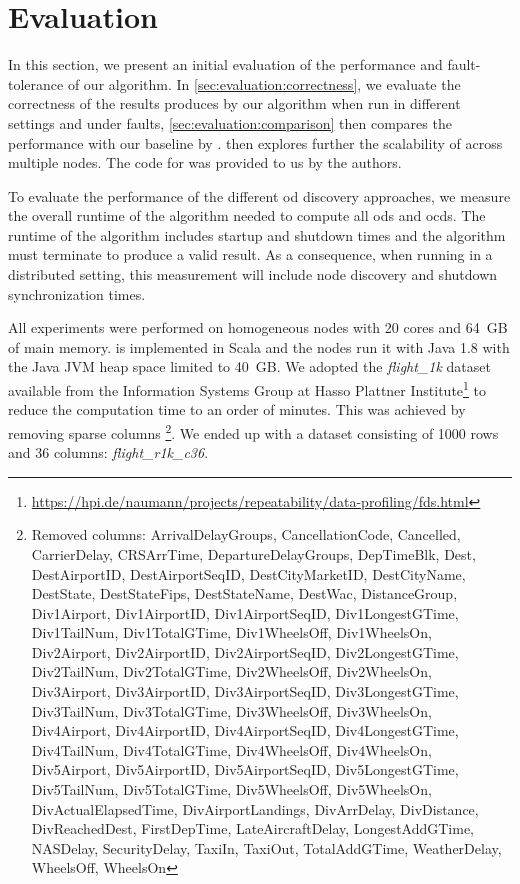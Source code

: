 
\section{Evaluation}\label{sec:evaluation}

  In this section, we present an initial evaluation of the performance and fault-tolerance of our algorithm.
  In \cref{sec:evaluation:correctness}, we evaluate the correctness of the results produces by our algorithm when run in different settings and under faults, \cref{sec:evaluation:comparison} then compares the performance with our baseline \ocddiscover{} by \citeauthor{consonni}.
   then explores further the scalability of \dodo{} across multiple nodes.
  The code for \ocddiscover{} was provided to us by the authors.

  To evaluate the performance of the different \gls{od} discovery approaches, we measure the overall runtime of the algorithm needed to compute all \glspl{od} and \glspl{ocd}.
  The runtime of the algorithm includes startup and shutdown times and the algorithm must terminate to produce a valid result.
  As a consequence, when running \dodo{} in a distributed setting, this measurement will include node discovery and shutdown synchronization times.

  All experiments were performed on homogeneous nodes with 20 cores and 64~GB of main memory.
  \dodo{} is implemented in Scala and the nodes run it with Java 1.8 with the Java JVM heap space limited to 40~GB.
  We adopted the \textit{flight\_1k} dataset available from the Information Systems Group at Hasso Plattner Institute\footnote{\url{https://hpi.de/naumann/projects/repeatability/data-profiling/fds.html}} to reduce the computation time to an order of minutes.
  This was achieved by removing sparse columns%
  \footnote{Removed columns: ArrivalDelayGroups, CancellationCode, Cancelled, CarrierDelay, CRSArrTime, DepartureDelayGroups, DepTimeBlk, Dest, DestAirportID, DestAirportSeqID, DestCityMarketID, DestCityName, DestState, DestStateFips, DestStateName, DestWac, DistanceGroup, Div1Airport, Div1AirportID, Div1AirportSeqID, Div1LongestGTime, Div1TailNum, Div1TotalGTime, Div1WheelsOff, Div1WheelsOn, Div2Airport, Div2AirportID, Div2AirportSeqID, Div2LongestGTime, Div2TailNum, Div2TotalGTime, Div2WheelsOff, Div2WheelsOn, Div3Airport, Div3AirportID, Div3AirportSeqID, Div3LongestGTime, Div3TailNum, Div3TotalGTime, Div3WheelsOff, Div3WheelsOn, Div4Airport, Div4AirportID, Div4AirportSeqID, Div4LongestGTime, Div4TailNum, Div4TotalGTime, Div4WheelsOff, Div4WheelsOn, Div5Airport, Div5AirportID, Div5AirportSeqID, Div5LongestGTime, Div5TailNum, Div5TotalGTime, Div5WheelsOff, Div5WheelsOn, DivActualElapsedTime, DivAirportLandings, DivArrDelay, DivDistance, DivReachedDest, FirstDepTime, LateAircraftDelay, LongestAddGTime, NASDelay, SecurityDelay, TaxiIn, TaxiOut, TotalAddGTime, WeatherDelay, WheelsOff, WheelsOn}.
  We ended up with a dataset consisting of 1000 rows and 36 columns: \textit{flight\_r1k\_c36}.

